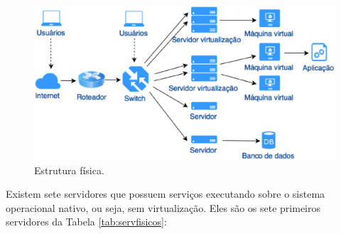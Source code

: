 \begin{figure}[h!]
 \centering
 \includegraphics[width=430px]{img/servfisicos.eps}
 \caption{Estrutura física.}
 \label{fig:servfisicos}
\end{figure}

Existem sete servidores que possuem serviços executando sobre o sistema operacional nativo, ou seja, sem virtualização. Eles são os sete 
primeiros servidores da Tabela \ref{tab:servfisicos}:
